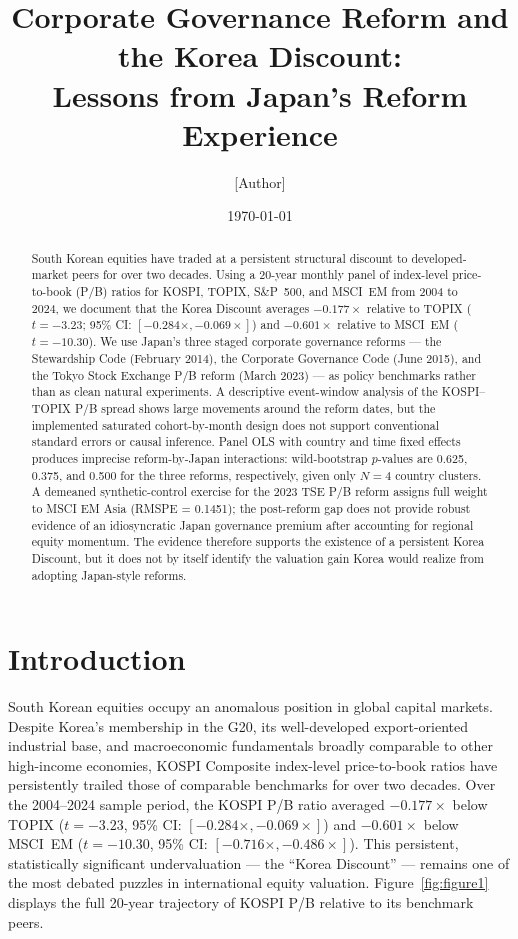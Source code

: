 \documentclass[12pt]{article}
\title{Corporate Governance Reform and the Korea Discount:\\
Lessons from Japan's Reform Experience}
\author{[Author]}
\date{\today}
\begin{document}
\maketitle

\begin{abstract}
South Korean equities have traded at a persistent structural discount to developed-market peers
for over two decades. Using a 20-year monthly panel of index-level price-to-book (P/B) ratios
for KOSPI, TOPIX, S\&P~500, and MSCI~EM from 2004 to 2024, we document that the Korea Discount
averages $-0.177\times$ relative to TOPIX ($t=-3.23$; 95\% CI: $[-0.284\times, -0.069\times]$)
and $-0.601\times$ relative to MSCI~EM ($t=-10.30$). We use Japan's three staged corporate
governance reforms --- the Stewardship Code (February 2014), the Corporate Governance Code
(June 2015), and the Tokyo Stock Exchange P/B reform (March 2023) --- as policy benchmarks
rather than as clean natural experiments. A descriptive event-window analysis of the KOSPI--TOPIX P/B
spread shows large movements around the reform dates, but the implemented saturated
cohort-by-month design does not support conventional standard errors or causal inference.
Panel OLS with country and time fixed effects produces imprecise reform-by-Japan interactions:
wild-bootstrap $p$-values are 0.625, 0.375, and 0.500 for the three reforms, respectively,
given only $N=4$ country clusters. A demeaned synthetic-control exercise for the 2023 TSE
P/B reform assigns full weight to MSCI EM Asia (RMSPE = 0.1451); the post-reform gap does
not provide robust evidence of an idiosyncratic Japan governance premium after accounting
for regional equity momentum. The evidence therefore supports the existence of a persistent
Korea Discount, but it does not by itself identify the valuation gain Korea would realize
from adopting Japan-style reforms.
\end{abstract}

\newpage
\tableofcontents
\newpage

\section{Introduction}
\label{sec:intro}

South Korean equities occupy an anomalous position in global capital markets. Despite Korea's
membership in the G20, its well-developed export-oriented industrial base, and macroeconomic
fundamentals broadly comparable to other high-income economies, KOSPI Composite index-level
price-to-book ratios have persistently trailed those of comparable benchmarks for over two
decades. Over the 2004--2024 sample period, the KOSPI P/B ratio averaged $-0.177\times$ below
TOPIX ($t=-3.23$, 95\% CI: $[-0.284\times, -0.069\times]$) and $-0.601\times$ below MSCI~EM
($t=-10.30$, 95\% CI: $[-0.716\times, -0.486\times]$). This persistent, statistically
significant undervaluation --- the ``Korea Discount'' --- remains one of the most debated
puzzles in international equity valuation. Figure~\ref{fig:figure1} displays the full
20-year trajectory of KOSPI P/B relative to its benchmark peers.
\end{document}
